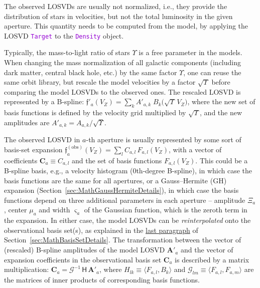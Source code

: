 \documentclass[12pt]{article}
\newcommand{\ttt}[1]{\textcolor{darkviolet}{\texttt{#1}}}
\begin{document}
The observed LOSVDs are usually not normalized, i.e., they provide the distribution of stars in velocities, but not the total luminosity in the given aperture. This quantity needs to be computed from the model, by applying the LOSVD \ttt{Target} to the \ttt{Density} object.

Typically, the mass-to-light ratio of stars $\Upsilon$ is a free parameter in the models. When changing the mass normalization of all galactic components (including dark matter, central black hole, etc.) by the same factor $\Upsilon$, one can reuse the same orbit library, but rescale the model velocities by a factor $\sqrt\Upsilon$ before comparing the model LOSVDs to the observed ones. The rescaled LOSVD is represented by a B-spline: 
$\mathfrak{f}'_a(V_Z) = \sum_k A'_{a,k}\;B_k\big(\sqrt\Upsilon\,V_Z\big)$, where the new set of basis functions is defined by the velocity grid multiplied by $\sqrt\Upsilon$, and the new amplitudes are $A'_{a,k} = A_{a,k}/\sqrt\Upsilon$.

The observed LOSVD in $a$-th aperture is usually represented by some sort of basis-set expansion 
$\mathfrak{f}^\mathrm{(obs)}_a(V_Z) = \sum_l C_{a,l}\,F_{a,l}(V_Z)$, with a vector of coefficients $\boldsymbol C_a \equiv C_{a,l}$ and the set of basis functions $F_{a,l}(V_Z)$. This could be a B-spline basis, e.g., a velocity histogram (0th-degree B-spline), in which case the basis functions are the same for all apertures, or a Gauss--Hermite (GH) expansion (Section~\ref{sec:MathGaussHermiteDetails}), in which case the basis functions depend on three additional parameters in each aperture -- amplitude $\Xi_a$, center $\mu_a$ and width $\varsigma_a$ of the Gaussian function, which is the zeroth term in the expansion. In either case, the model LOSVDs can be \textit{reinterpolated} onto the observational basis set(s), as explained in the \hyperref[sec:MathBasisSetChange]{last paragraph} of Section~\ref{sec:MathBasisSetDetails}. The transformation between the vector of (rescaled) B-spline amplitudes of the model LOSVD $\boldsymbol A'_a$ and the vector of expansion coefficients in the observational basis set $\boldsymbol C_a$ is described by a matrix multiplication: $\boldsymbol C_a = \mathcal G^{-1}\,\mathsf H\, \boldsymbol A'_a$, where $H_{lk} \equiv \langle F_{a,l}, B_k \rangle$ and $\mathcal G_{lm} \equiv \langle F_{a,l}, F_{a,m} \rangle$ are the matrices of inner products of corresponding basis functions.
\end{document}
